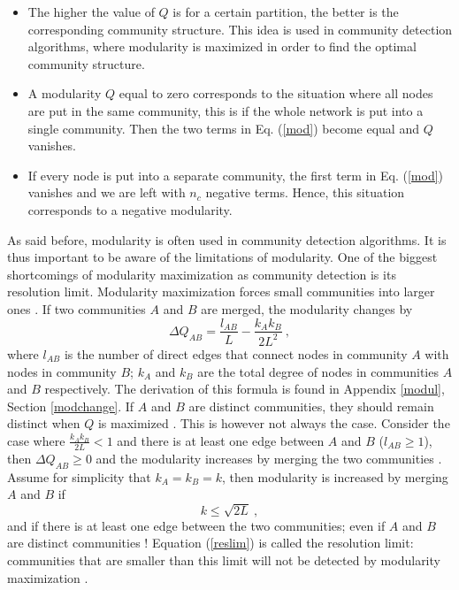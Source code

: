 \documentclass[11 pt , letterpaper , twoside , openright]{book}
\begin{document}
\begin{itemize}
	\item The higher the value of $Q$ is for a certain partition, the better is the corresponding community structure. This idea is used in community detection algorithms, where modularity is maximized in order to find the optimal community structure.
	\item A modularity $Q$ equal to zero corresponds to the situation where all nodes are put in the same community, this is if the whole network is put into a single community. Then the two terms in Eq. (\ref{mod}) become equal and $Q$ vanishes.
	\item If every node is put into a separate community, the first term in Eq. (\ref{mod}) vanishes and we are left with $n_c$ negative terms. Hence, this situation corresponds to a negative modularity.
\end{itemize}
As said before, modularity is often used in community detection algorithms. It is thus important to be aware of the limitations of modularity. One of the biggest shortcomings of modularity maximization as community detection is its resolution limit. Modularity maximization forces small communities into larger ones \cite{Albert2016}. If two communities $A$ and $B$ are merged, the modularity changes by \cite{Albert2016}
\begin{equation}
	\Delta Q_{AB} = \frac{l_{AB}}{L} - \frac{k_Ak_B}{2L^2} \ ,
\end{equation}
where $l_{AB}$ is the number of direct edges that connect nodes in community $A$ with nodes in community $B$; $k_A$ and $k_B$ are the total degree of nodes in communities $A$ and $B$ respectively. The derivation of this formula is found in Appendix \ref{modul}, Section \ref{modchange}. If $A$ and $B$ are distinct communities, they should remain distinct when $Q$ is maximized \cite{Albert2016}. This is however not always the case. Consider the case where $\frac{k_Ak_B}{2L} < 1$ and there is at least one edge between $A$ and $B$ ($l_{AB} \geqslant 1$), then $\Delta Q_{AB} \geqslant 0$ and the modularity increases by merging the two communities \cite{Albert2016}. Assume for simplicity that $k_A = k_B = k$, then modularity is increased by merging $A$ and $B$ if
\begin{equation}\label{reslim}
	k \leqslant \sqrt{2L} \ ,
\end{equation}
and if there is at least one edge between the two communities; even if $A$ and $B$ are distinct communities \cite{Albert2016}! Equation (\ref{reslim}) is called the resolution limit: communities that are smaller than this limit will not be detected by modularity maximization \cite{Albert2016}.
\end{document}
